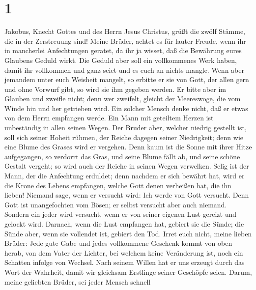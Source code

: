 \hypertarget{section}{%
\section{1}\label{section}}

 Jakobus, Knecht Gottes und des Herrn Jesus Christus,
grüßt die zwölf Stämme, die in der Zerstreuung sind! 
Meine Brüder, achtet es für lauter Freude, wenn ihr in mancherlei
Anfechtungen geratet,  da ihr ja wisset, daß die Bewährung
eures Glaubens Geduld wirkt.  Die Geduld aber soll ein
vollkommenes Werk haben, damit ihr vollkommen und ganz seiet und es euch
an nichts mangle.  Wenn aber jemandem unter euch Weisheit
mangelt, so erbitte er sie von Gott, der allen gern und ohne Vorwurf
gibt, so wird sie ihm gegeben werden.  Er bitte aber im
Glauben und zweifle nicht; denn wer zweifelt, gleicht der Meereswoge,
die vom Winde hin und her getrieben wird.  Ein solcher
Mensch denke nicht, daß er etwas von dem Herrn empfangen werde.
 Ein Mann mit geteiltem Herzen ist unbeständig in allen
seinen Wegen.  Der Bruder aber, welcher niedrig gestellt
ist, soll sich seiner Hoheit rühmen,  der Reiche dagegen
seiner Niedrigkeit; denn wie eine Blume des Grases wird er vergehen.
 Denn kaum ist die Sonne mit ihrer Hitze aufgegangen, so
verdorrt das Gras, und seine Blume fällt ab, und seine schöne Gestalt
vergeht; so wird auch der Reiche in seinen Wegen verwelken.
 Selig ist der Mann, der die Anfechtung erduldet; denn
nachdem er sich bewährt hat, wird er die Krone des Lebens empfangen,
welche Gott denen verheißen hat, die ihn lieben!  Niemand
sage, wenn er versucht wird: Ich werde von Gott versucht. Denn Gott ist
unangefochten vom Bösen; er selbst versucht aber auch niemand.
 Sondern ein jeder wird versucht, wenn er von seiner
eigenen Lust gereizt und gelockt wird.  Darnach, wenn die
Lust empfangen hat, gebiert sie die Sünde; die Sünde aber, wenn sie
vollendet ist, gebiert den Tod.  Irret euch nicht, meine
lieben Brüder:  Jede gute Gabe und jedes vollkommene
Geschenk kommt von oben herab, von dem Vater der Lichter, bei welchem
keine Veränderung ist, noch ein Schatten infolge von Wechsel.
 Nach seinem Willen hat er uns erzeugt durch das Wort der
Wahrheit, damit wir gleichsam Erstlinge seiner Geschöpfe seien.
 Darum, meine geliebten Brüder, sei jeder Mensch schnell
